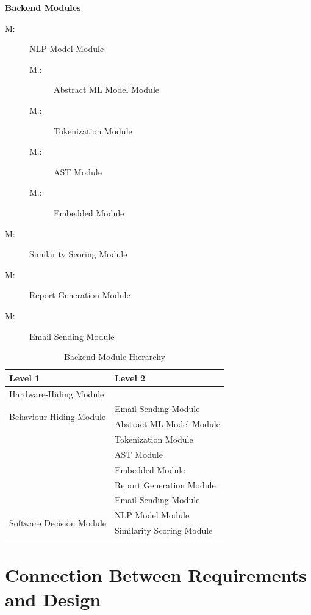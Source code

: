 \documentclass[12pt, titlepage]{article}
\newcounter{mnum}
\newcommand{\mthemnum}{M\themnum}
\newcounter{smnum}[mnum]
\newcommand{\smthemnum}{\mthemnum.\thesmnum}
\begin{document}
\textbf{Backend Modules}
\begin{description}
  \item [ \mthemnum \label{mNLP}:] NLP Model Module
  \begin{description}
    \item [ \smthemnum \label{smMLModel}:] Abstract ML Model Module
    \item [ \smthemnum \label{smTokenization}:] Tokenization Module
    \item [ \smthemnum \label{smAST}:] AST Module
    \item [ \smthemnum \label{smEmbedded}:] Embedded Module
  \end{description}
  \item [ \mthemnum \label{mScoring}:] Similarity Scoring Module
  \item [ \mthemnum \label{mReport}:] Report Generation Module
  \item [ \mthemnum \label{mEmail}:] Email Sending Module
\end{description}

\begin{table}[h!]
  \centering
  \begin{tabular}{p{} p{}}
  \toprule
  \textbf{Level 1} & \textbf{Level 2} \\
  \midrule
  {Hardware-Hiding Module} & ~ \\
  \midrule
  \multirow{2}{*}{Behaviour-Hiding Module} & Email Sending Module \\
  & Abstract ML Model Module \\
  & Tokenization Module \\
  & AST Module \\
  & Embedded Module \\
  & Report Generation Module \\
  & Email Sending Module \\
  \midrule
  \multirow{2}{*}{Software Decision Module} & NLP Model Module \\
  & Similarity Scoring Module \\
  \bottomrule
  \end{tabular}
  \caption{Backend Module Hierarchy}
  \label{TblBMH}
\end{table}

\section{Connection Between Requirements and Design} \label{SecConnection}
\end{document}
